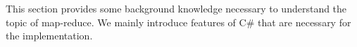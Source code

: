 This section provides some background knowledge necessary to understand the topic of map-reduce. We mainly introduce features of C\# that are necessary for the implementation.